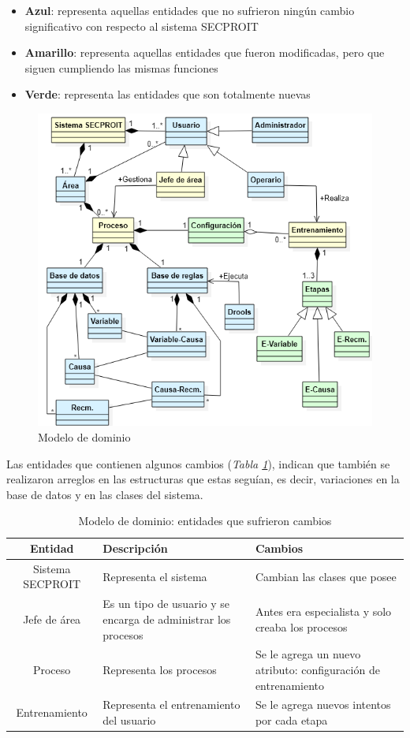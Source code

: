\begin{itemize}
\item \textbf{Azul}: representa aquellas entidades que no sufrieron ningún cambio significativo con respecto al sistema SECPROIT
\item \textbf{Amarillo}: representa aquellas entidades que fueron modificadas, pero que siguen cumpliendo las mismas funciones
\item \textbf{Verde}: representa las entidades que son totalmente nuevas
\end{itemize}

\begin{figure}[h]
\centering
 \includegraphics[width=0.7\linewidth]{imagen/dominio.png}
 \caption{Modelo de dominio}
 \label{fig:dominio} 
\end{figure}

Las entidades que contienen algunos cambios (\textsl{Tabla \ref{tab:ent-amarilla}}), indican que también se realizaron arreglos en las estructuras que estas seguían, es decir, variaciones en la base de datos y en las clases del sistema.

\begin{table}[H]
\begin{center}
\begin{tabular}{ | c | p{5cm} |  p{5.2cm} | }
\hline
\textbf{Entidad} & \textbf{Descripción} & \textbf{Cambios}\\
\hline
Sistema SECPROIT & Representa el sistema & Cambian las clases que posee \\
\hline
Jefe de área & Es un tipo de usuario y se encarga de administrar los procesos & Antes era especialista y solo creaba los procesos \\
\hline
Proceso & Representa los procesos & Se le agrega un nuevo atributo: configuración de entrenamiento \\
\hline
Entrenamiento & Representa el entrenamiento del usuario & Se le agrega nuevos intentos por cada etapa \\
\hline
\end{tabular}
\caption{Modelo de dominio: entidades que sufrieron cambios}
\label{tab:ent-amarilla}
\end{center}
\end{table}

